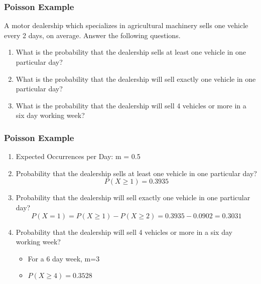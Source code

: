 
\begin{frame}
\frametitle{Poisson Example}
A motor dealership which specializes in agricultural machinery sells one vehicle every 2 days, on average. Answer the following questions.
    \begin{enumerate}
    \item  What is the probability that the dealership sells at least one vehicle in one particular day?
    \item  What is the probability that the dealership will sell exactly one vehicle in one particular day?
    \item  What is the probability that the dealership will sell 4 vehicles or more in a six day working week?
    \end{enumerate}
\end{frame}

\begin{frame}
\frametitle{Poisson Example}

    \begin{enumerate}
    \item Expected Occurrences per Day: m = 0.5
    \item Probability that the dealership sells at least one vehicle in one particular day?
    \[ P(X \geq 1) = 0.3935 \]
    \item Probability that the dealership will sell exactly one vehicle in one particular day?
    \[ P(X = 1) = P(X \geq 1) - P(X \geq 2)  = 0.3935 - 0.0902 = 0.3031\]
    \item Probability that the dealership will sell 4 vehicles or more in a six day working week?
    \begin{itemize}
    \item For a 6 day week, m=3
    \item $P(X \geq 4) = 0.3528$
    \end{itemize}
    \end{enumerate}
\end{frame}
